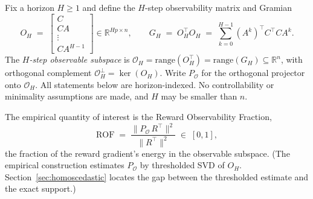 \documentclass[11pt]{article}
\theoremstyle{remark}
\newcommand{\R}{\mathbb{R}}
\newcommand{\Obs}{\mathcal{O}}
\newcommand{\ROF}{\mathrm{ROF}}
\begin{document}
Fix a horizon $H \ge 1$ and define the $H$-step observability matrix and Gramian
\begin{equation}
O_H \;=\; \begin{bmatrix} C \\ CA \\ \vdots \\ CA^{H-1} \end{bmatrix} \in \R^{Hp \times n},
\qquad
G_H \;=\; O_H^\top O_H \;=\; \sum_{k=0}^{H-1} (A^k)^\top C^\top C A^k .
\end{equation}
The \emph{$H$-step observable subspace} is $\Obs_H = \mathrm{range}(O_H^\top) = \mathrm{range}(G_H) \subseteq \R^n$, with orthogonal complement $\Obs_H^\perp = \ker(O_H)$. Write $P_{\Obs}$ for the orthogonal projector onto $\Obs_H$. All statements below are horizon-indexed. No controllability or minimality assumptions are made, and $H$ may be smaller than $n$.

The empirical quantity of interest is the Reward Observability Fraction,
\begin{equation}
\ROF \;=\; \frac{\lVert P_{\Obs}\, R^\top \rVert^2}{\lVert R^\top \rVert^2} \;\in\; [0,1],
\end{equation}
the fraction of the reward gradient's energy in the observable subspace. (The empirical construction estimates $P_\Obs$ by thresholded SVD of $O_H$. Section~\ref{sec:homoscedastic} locates the gap between the thresholded estimate and the exact support.)
\end{document}

